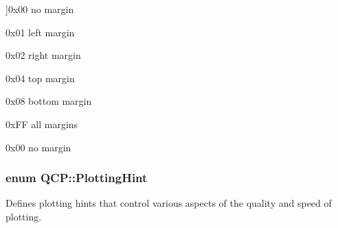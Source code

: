 \begin{Desc}
\begin{description}
{}]{\ttfamily 0x00} no margin \item[{\em 
ms\+Left\hypertarget{namespace_q_c_p_a7e487e3e2ccb62ab7771065bab7cae54a9a47416a401c58f0c6219d17152757a9}{}\label{namespace_q_c_p_a7e487e3e2ccb62ab7771065bab7cae54a9a47416a401c58f0c6219d17152757a9}
}]{\ttfamily 0x01} left margin \item[{\em 
ms\+Right\hypertarget{namespace_q_c_p_a7e487e3e2ccb62ab7771065bab7cae54a75c2181d12e8b8346e2e99e1beb4b694}{}\label{namespace_q_c_p_a7e487e3e2ccb62ab7771065bab7cae54a75c2181d12e8b8346e2e99e1beb4b694}
}]{\ttfamily 0x02} right margin \item[{\em 
ms\+Top\hypertarget{namespace_q_c_p_a7e487e3e2ccb62ab7771065bab7cae54a19acab50954e500a120e251211ff39bf}{}\label{namespace_q_c_p_a7e487e3e2ccb62ab7771065bab7cae54a19acab50954e500a120e251211ff39bf}
}]{\ttfamily 0x04} top margin \item[{\em 
ms\+Bottom\hypertarget{namespace_q_c_p_a7e487e3e2ccb62ab7771065bab7cae54ae0bf0dc064e422ecd13970b6a5f6f0fb}{}\label{namespace_q_c_p_a7e487e3e2ccb62ab7771065bab7cae54ae0bf0dc064e422ecd13970b6a5f6f0fb}
}]{\ttfamily 0x08} bottom margin \item[{\em 
ms\+All\hypertarget{namespace_q_c_p_a7e487e3e2ccb62ab7771065bab7cae54a79334be9c93ef74c6211fee80487945a}{}\label{namespace_q_c_p_a7e487e3e2ccb62ab7771065bab7cae54a79334be9c93ef74c6211fee80487945a}
}]{\ttfamily 0x\+FF} all margins \item[{\em 
ms\+None\hypertarget{namespace_q_c_p_a7e487e3e2ccb62ab7771065bab7cae54a3108d916ac730d3b4ecdfc2911de2595}{}\label{namespace_q_c_p_a7e487e3e2ccb62ab7771065bab7cae54a3108d916ac730d3b4ecdfc2911de2595}
}]{\ttfamily 0x00} no margin \end{description}
\end{Desc}
\subsubsection[{\texorpdfstring{Plotting\+Hint}{PlottingHint}}]{\setlength{\rightskip}{0pt plus 5cm}enum {\bf Q\+C\+P\+::\+Plotting\+Hint}}\hypertarget{namespace_q_c_p_a5400e5fcb9528d92002ddb938c1f4ef4}{}\label{namespace_q_c_p_a5400e5fcb9528d92002ddb938c1f4ef4}
Defines plotting hints that control various aspects of the quality and speed of plotting.

